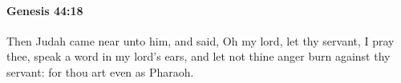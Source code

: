 
		\paragraph{Genesis 44:18} %
			\label{GENESIS-44-18}

			Then Judah came near unto him, and said, Oh my lord, let thy servant, I pray thee, speak a word in my lord's ears, and let not thine anger burn against thy servant: for thou art even as Pharaoh.


